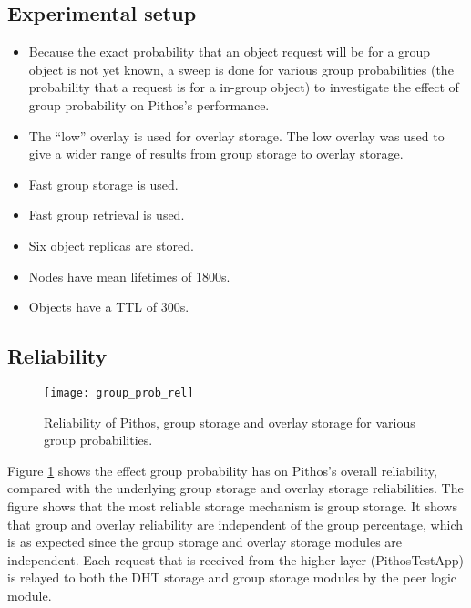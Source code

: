 \subsection{Experimental setup}

\begin{itemize}
\item Because the exact probability that an object request will be for a group object is not yet known, a sweep is done for various group probabilities (the probability that a request is for a in-group object) to investigate the effect of group probability on Pithos's performance.

\item The ``low'' overlay is used for overlay storage. The low overlay was used to give a wider range of results from group storage to overlay storage.

 \item Fast  group storage is used.

 \item Fast group retrieval is used.

 \item Six object replicas are stored.

 \item Nodes have mean lifetimes of 1800s.

 \item Objects have a TTL of 300s.
\end{itemize}

\subsection{Reliability}

\begin{figure}[htbp]
 \centering
 \texttt{[image: group\_prob\_rel]}
 \caption{Reliability of Pithos, group storage and overlay storage for various group probabilities.}
 \label{fig_group_prob_rel}
\end{figure}
%
Figure \ref{fig_group_prob_rel} shows the effect group probability has on Pithos's overall reliability, compared with the underlying group storage and overlay storage reliabilities. The figure shows that the most reliable storage mechanism is group storage. It shows that group and overlay reliability are independent of the group percentage, which is as expected since the group storage and overlay storage modules are independent. Each request that is received from the higher layer (PithosTestApp) is relayed to both the DHT storage and group storage modules by the peer logic module.

